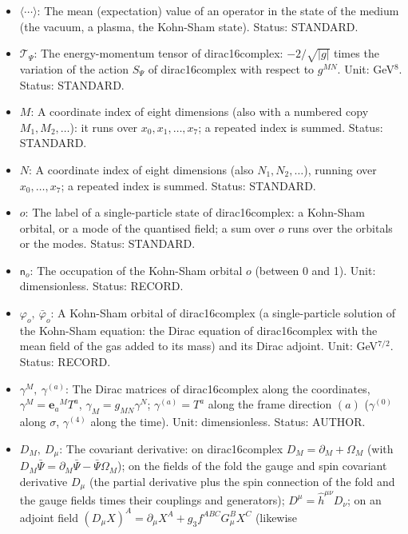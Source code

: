 \documentclass[
  10pt,
]{article}
\providecommand{\tightlist}{%
  \setlength{\itemsep}{0pt}\setlength{\parskip}{0pt}}
\begin{document}
\begin{itemize}
\tightlist
\item
  \(\langle\cdots\rangle\): The mean (expectation) value of an operator
  in the state of the medium (the vacuum, a plasma, the Kohn-Sham
  state). Status: STANDARD.
\item
  \(\mathcal{T}_\Psi\): The energy-momentum tensor of dirac16complex:
  \(-2/\sqrt{\lvert g\rvert}\) times the variation of the action
  \(S_\Psi\) of dirac16complex with respect to \(g^{MN}\). Unit:
  GeV\(^8\). Status: STANDARD.
\item
  \(M\): A coordinate index of eight dimensions (also with a numbered
  copy \(M_1, M_2, \dots\)): it runs over \(x_0, x_1, \dots, x_7\); a
  repeated index is summed. Status: STANDARD.
\item
  \(N\): A coordinate index of eight dimensions (also
  \(N_1, N_2, \dots\)), running over \(x_0, \dots, x_7\); a repeated
  index is summed. Status: STANDARD.
\item
  \(o\): The label of a single-particle state of dirac16complex: a
  Kohn-Sham orbital, or a mode of the quantised field; a sum over \(o\)
  runs over the orbitals or the modes. Status: STANDARD.
\item
  \(\mathsf{n}_o\): The occupation of the Kohn-Sham orbital \(o\)
  (between 0 and 1). Unit: dimensionless. Status: RECORD.
\item
  \(\varphi_o,\ \bar\varphi_o\): A Kohn-Sham orbital of dirac16complex
  (a single-particle solution of the Kohn-Sham equation: the Dirac
  equation of dirac16complex with the mean field of the gas added to its
  mass) and its Dirac adjoint. Unit: GeV\(^{7/2}\). Status: RECORD.
\item
  \(\gamma^M,\ \gamma^{(a)}\): The Dirac matrices of dirac16complex
  along the coordinates, \(\gamma^M = \mathbf{e}_a{}^MT^a\),
  \(\gamma_M = g_{MN}\gamma^N\); \(\gamma^{(a)} = T^a\) along the frame
  direction \((a)\) (\(\gamma^{(0)}\) along \(\sigma\), \(\gamma^{(4)}\)
  along the time). Unit: dimensionless. Status: AUTHOR.
\item
  \(D_M,\ D_\mu\): The covariant derivative: on dirac16complex
  \(D_M = \partial_M + \Omega_M\) (with
  \(D_M\bar\Psi = \partial_M\bar\Psi - \bar\Psi\Omega_M\)); on the
  fields of the fold the gauge and spin covariant derivative \(D_\mu\)
  (the partial derivative plus the spin connection of the fold and the
  gauge fields times their couplings and generators);
  \(D^\mu = \hat h^{\mu\nu}D_\nu\); on an adjoint field
  \((D_\mu X)^A = \partial_\mu X^A + g_3f^{ABC}G^B_\mu X^C\) (likewise

\end{itemize}
\end{document}
